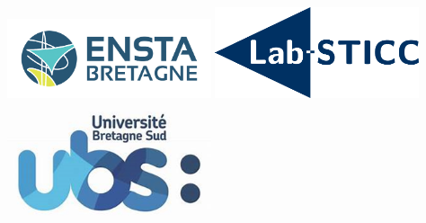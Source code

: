 \begin{titlepage}
\vspace{2cm}
\includegraphics[width=6cm]{imgs/logo_ensta.jpg}
\includegraphics[width=6cm]{imgs/logo-lab-sticc2.png}
\includegraphics[width=6cm]{imgs/logo_ubs_transparent.png} 

\vfill %

\end{titlepage}